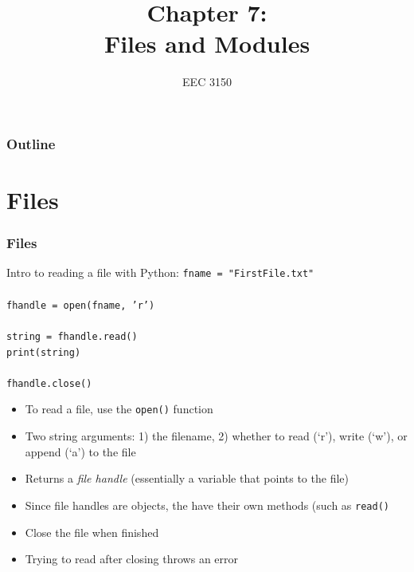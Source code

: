 \documentclass{beamer}
\title{Chapter 7: \\ Files and Modules}
\author{EEC 3150}
\date{}
\institute{Trevecca Nazarene University}
\newcommand{\code}[1]{\texttt{#1}}
\newcommand{\tab}{\hspace*{22pt}}
\begin{document}
\frame{\titlepage}
 
\begin{frame}	
	\frametitle{Outline}
	\tableofcontents	
\end{frame}


\section{Files}

\begin{frame}	
\end{frame}

\begin{frame}	
	\frametitle{Files}
	
	\begin{block}{Intro to reading a file with Python:}
			\code{fname = "FirstFile.txt" \\
					\tab \\
					fhandle = open(fname, 'r')  \\
					\tab \\
					string = fhandle.read() \\
					print(string) \\
					\tab \\
					fhandle.close() 
			}
		\endminipage\hfill
			\begin{itemize}
				\item To read a file, use the \code{open()} function
				\item Two string arguments: 1) the filename, 2) whether to read (`r'), write (`w'), or append (`a') to the file
				\item Returns a \emph{file handle} (essentially a variable that points to the file)
				\item Since file handles are objects, the have their own methods (such as \code{read()}
				\item Close the file when finished
				\item Trying to read after closing throws an error
			\end{itemize}
		\endminipage\hfill
	\end{block}
	
\end{frame}
\end{document}
